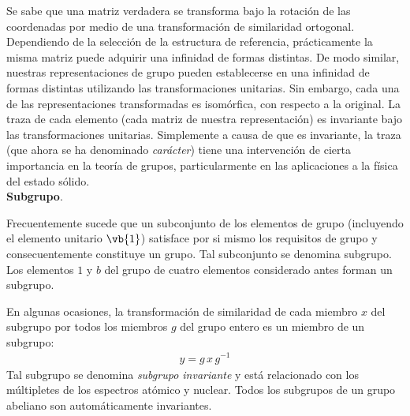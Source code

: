 Se sabe que una matriz verdadera se transforma bajo la rotación de las coordenadas por medio de una transformación de similaridad ortogonal. Dependiendo de la selección de la estructura de referencia, prácticamente la misma matriz puede adquirir una infinidad de formas distintas. De modo similar, nuestras re­presentaciones de grupo pueden establecerse en una infinidad de formas distintas utilizando las transformaciones unitarias. Sin embargo, cada una de las representaciones transformadas es isomórfica, con respecto a la
original. La traza de cada elemento (cada matriz de nuestra representación) es invariante bajo las transformaciones unitarias. Simplemente a causa de que es invariante, la traza (que ahora se ha denominado \emph{carácter}) tiene una intervención de cierta importancia en la teoría de grupos, particularmente en las aplicaciones a la física del estado sólido.
\\[1em]
\noindent
\textbf{Subgrupo}.

Frecuentemente sucede que un subconjunto de los elementos de grupo (incluyendo el elemento unitario $\vb{1}$) satisface por si mismo los requisitos de grupo y consecuentemente constituye un grupo. Tal subconjunto se denomina subgrupo. Los elementos $1$ y $b$ del grupo de cuatro elementos considerado antes forman un subgrupo.
\par
En algunas ocasiones, la transformación de similaridad de cada miembro $x$ del subgrupo por todos los miembros $g$ del grupo entero es un miembro de un subgrupo:
\begin{align}
y = g \, x \, g^{-1}
\label{eq:ecuacion_04_189}
\end{align}
Tal subgrupo se denomina \emph{subgrupo invariante} y está relacionado con los múltipletes de los espectros atómico y nuclear. Todos los subgrupos de un grupo abeliano son automáticamente invariantes.




